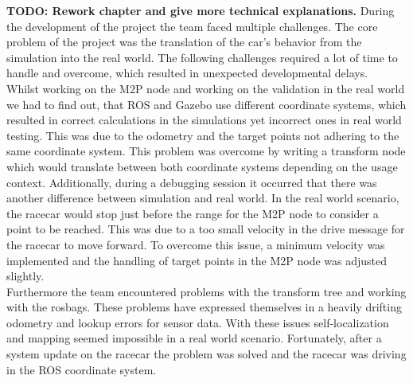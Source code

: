 \textbf{TODO: Rework chapter and give more technical explanations.} During the development of the project the team faced multiple challenges. The core problem of the project was the translation of the car's behavior from the simulation into the real world. The following challenges required a lot of time to handle and overcome, which resulted in unexpected developmental delays.\\
\newline
Whilst working on the M2P node and working on the validation in the real world we had to find out, that ROS and Gazebo use different coordinate systems, which resulted in correct calculations in the simulations yet incorrect ones in real world testing. This was due to the odometry and the target points not adhering to the same coordinate system. This problem was overcome by writing a transform node which would translate between both coordinate systems depending on the usage context. 
Additionally, during a debugging session it occurred that there was another difference between simulation and real world. In the real world scenario, the racecar would stop just before the range for the M2P node to consider a point to be reached. This was due to a too small velocity in the drive message for the racecar to move forward. To overcome this issue, a minimum velocity was implemented and the handling of target points in the M2P node was adjusted slightly.\\
\newline
Furthermore the team encountered problems with the transform tree and working with the rosbags. These problems have expressed themselves in a heavily drifting odometry and lookup errors for sensor data. With these issues self-localization and mapping seemed impossible in a real world scenario. Fortunately, after a system update on the racecar the problem was solved and the racecar was driving in the ROS coordinate system.
